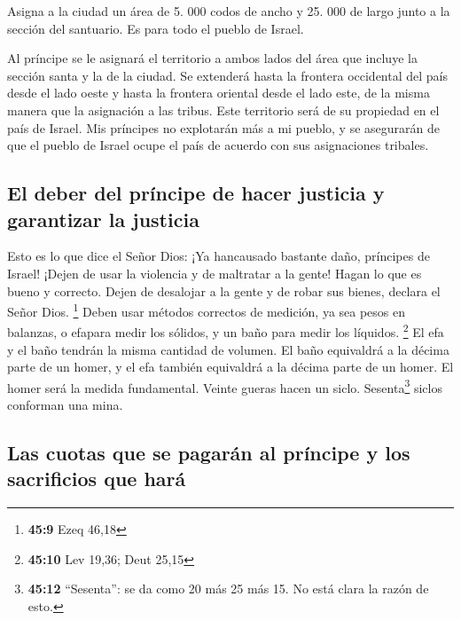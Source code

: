  Asigna a la ciudad un área de 5. 000 codos de ancho y 25.
000 de largo junto a la sección del santuario. Es para todo el pueblo de
Israel.

 Al príncipe se le asignará el territorio a ambos lados
del área que incluye la sección santa y la de la ciudad. Se extenderá
hasta la frontera occidental del país desde el lado oeste y hasta la
frontera oriental desde el lado este, de la misma manera que la
asignación a las tribus.  Este territorio será de su
propiedad en el país de Israel. Mis príncipes no explotarán más a mi
pueblo, y se asegurarán de que el pueblo de Israel ocupe el país de
acuerdo con sus asignaciones tribales.

\hypertarget{el-deber-del-pruxedncipe-de-hacer-justicia-y-garantizar-la-justicia}{%
\subsection{El deber del príncipe de hacer justicia y garantizar la
justicia}\label{el-deber-del-pruxedncipe-de-hacer-justicia-y-garantizar-la-justicia}}

 Esto es lo que dice el Señor Dios: ¡Ya hancausado
bastante daño, príncipes de Israel! ¡Dejen de usar la violencia y de
maltratar a la gente! Hagan lo que es bueno y correcto. Dejen de
desalojar a la gente y de robar sus bienes, declara el Señor Dios.
\footnote{\textbf{45:9} Ezeq 46,18}  Deben usar métodos
correctos de medición, ya sea pesos en balanzas, o efapara medir los
sólidos, y un baño para medir los líquidos. \footnote{\textbf{45:10} Lev
  19,36; Deut 25,15}  El efa y el baño tendrán la misma
cantidad de volumen. El baño equivaldrá a la décima parte de un homer, y
el efa también equivaldrá a la décima parte de un homer. El homer será
la medida fundamental.  Veinte gueras hacen un siclo.
Sesenta\footnote{\textbf{45:12} ``Sesenta'': se da como 20 más 25 más
  15. No está clara la razón de esto.} siclos conforman una mina.

\hypertarget{las-cuotas-que-se-pagaruxe1n-al-pruxedncipe-y-los-sacrificios-que-haruxe1}{%
\subsection{Las cuotas que se pagarán al príncipe y los sacrificios que
hará}\label{las-cuotas-que-se-pagaruxe1n-al-pruxedncipe-y-los-sacrificios-que-haruxe1}}

